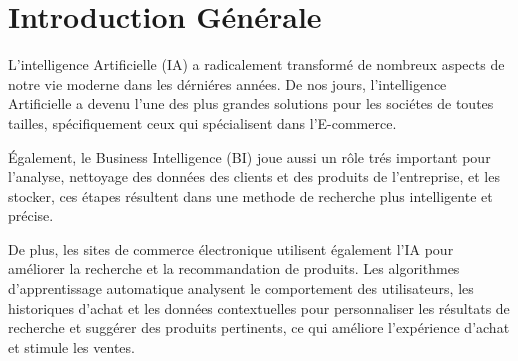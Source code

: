 \chapter{Introduction Générale}

\noindent
L'intelligence Artificielle (IA) a radicalement transformé de nombreux aspects de notre vie moderne dans les dérniéres années. De nos jours, l'intelligence Artificielle a devenu l'une des plus grandes solutions pour les sociétes de toutes tailles, spécifiquement ceux qui spécialisent dans l'E-commerce.

\noindent
Également, le Business Intelligence (BI) joue aussi un rôle trés important pour l'analyse, nettoyage des données des clients et des produits de l'entreprise, et les stocker, ces étapes résultent dans une methode de recherche plus intelligente et précise.

\noindent
De plus, les sites de commerce électronique utilisent également l'IA pour améliorer la recherche et la recommandation de produits. Les algorithmes d'apprentissage automatique analysent le comportement des utilisateurs, les historiques d'achat et les données contextuelles pour personnaliser les résultats de recherche et suggérer des produits pertinents, ce qui améliore l'expérience d'achat et stimule les ventes.

\newpage